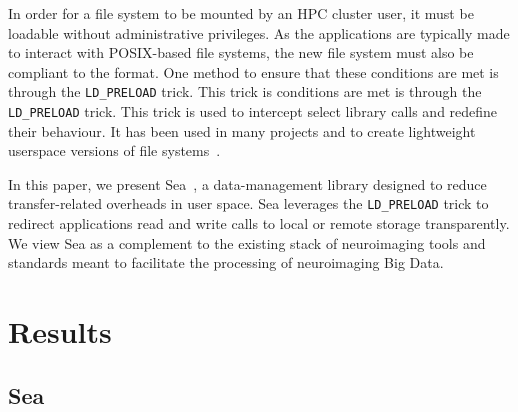 \documentclass[fleqn,10pt]{wlscirep}
\begin{document}
    In order for a file system to be mounted by an HPC cluster user, it must be
    loadable without administrative privileges. As the applications are
    typically made to interact with POSIX-based file systems, the new file
    system must also be compliant to the format. One method to ensure that these
    conditions are met is through the \texttt{LD\_PRELOAD} trick. This trick is
    conditions are met is through the \texttt{LD\_PRELOAD} trick. This trick is
    used to intercept select library calls and redefine their behaviour. It has
    been used in many projects and to create lightweight userspace versions of
    file systems~\cite{xtreemfs,burstfs,gekkofs}. 
    
    In this paper, we present Sea~\cite{hayot2022sea}, a data-management library designed to reduce
    transfer-related overheads in user space. Sea leverages the \texttt{LD\_PRELOAD} trick to redirect applications read and write calls to 
    local or remote storage transparently. We view Sea as a complement
    to the existing stack of neuroimaging tools and standards meant to facilitate 
    the processing of neuroimaging Big Data.   
    
    
    
    
    
    \section{Results}

    \subsection{Sea}
    
\end{document}
